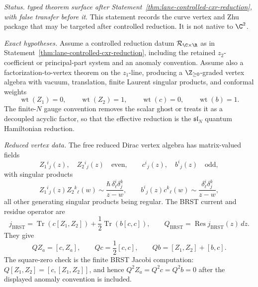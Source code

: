 \begin{stmt}\label{thm:lane-reduced-dirac-brst-zhu}
  \emph{Status.} \emph{typed theorem surface after
  Statement~\ref{thm:lane-controlled-cxr-reduction}, with false transfer
  before it}.  This statement records the curve vertex and Zhu package
  that may be targeted after controlled reduction.  It is not native to
  \(\C^2\).

  \emph{Exact hypotheses.} Assume a controlled reduction datum
  \(\mathcal R_{\C\times\R}\) as in
  Statement~\ref{thm:lane-controlled-cxr-reduction}, including the
  retained \(z_2\)-coefficient or principal-part system and an anomaly
  convention.  Assume also a factorization-to-vertex theorem on the
  \(z_1\)-line, producing a \(\Z_{\ge0}\)-graded vertex algebra with
  vacuum, translation, finite Laurent singular products, and conformal
  weights
  \[
    \operatorname{wt}(Z_1)=0,\qquad
    \operatorname{wt}(Z_2)=1,\qquad
    \operatorname{wt}(c)=0,\qquad
    \operatorname{wt}(b)=1.
  \]
  The finite-\(N\) gauge convention removes the scalar ghost or treats it
  as a decoupled acyclic factor, so that the effective reduction is the
  \(\mathfrak{sl}_N\) quantum Hamiltonian reduction.

  \emph{Reduced vertex data.} The free reduced Dirac vertex algebra has
  matrix-valued fields
  \[
    Z_1{}^i{}_j(z),\quad Z_2{}^i{}_j(z)
    \quad\text{even},\qquad
    c^i{}_j(z),\quad b^i{}_j(z)
    \quad\text{odd},
  \]
  with singular products
  \[
    Z_1{}^i{}_j(z)Z_2{}^k{}_\ell(w)
    \sim
    \frac{\hbar\,\delta^i_\ell\delta^k_j}{z-w},
    \qquad
    b^i{}_j(z)c^k{}_\ell(w)
    \sim
    \frac{\delta^i_\ell\delta^k_j}{z-w},
  \]
  all other generating singular products being regular.  The BRST
  current and residue operator are
  \[
    j_{\mathrm{BRST}}
    =
    \operatorname{Tr}(c[Z_1,Z_2])
    +\frac12\operatorname{Tr}(b[c,c]),
    \qquad
    Q_{\mathrm{BRST}}=\operatorname{Res}j_{\mathrm{BRST}}(z)\,dz .
  \]
  They give
  \[
    QZ_a=[c,Z_a],\qquad
    Qc=\frac12[c,c],\qquad
    Qb=[Z_1,Z_2]+[b,c].
  \]
  The square-zero check is the finite BRST Jacobi computation:
  \(Q[Z_1,Z_2]=[c,[Z_1,Z_2]]\), and hence
  \(Q^2Z_a=Q^2c=Q^2b=0\) after the displayed anomaly convention is
  included.


\end{stmt}
